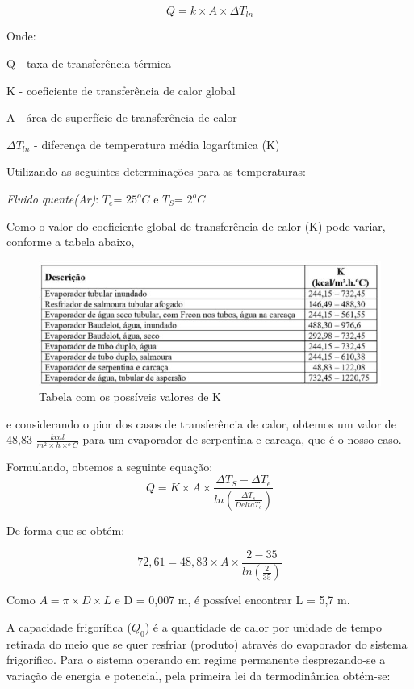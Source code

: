 	\begin{equation}
	Q = k \times A \times \Delta T_{ln}
	\end{equation}
	
	Onde:
	
	Q - taxa de transferência térmica 
	
	K - coeficiente de transferência de calor global
	
	A - área de superfície de transferência de calor
	
	$\Delta T_{ln}$ - diferença de temperatura média logarítmica (K)
	
	Utilizando as seguintes determinações para as temperaturas:
	
	\textit{Fluido quente(Ar)}: $T_e$= $25^oC$    e     $T_S$= $2^oC$
	
	
Como o valor do coeficiente global de transferência de calor (K) pode variar, conforme a tabela abaixo,
	\begin{figure}[H]
	\begin{center}
	\includegraphics[scale =1]{figuras/Tabela_K}
	\caption{Tabela com os possíveis valores de K}
	\end{center}
	\end{figure}
	
	e considerando o pior dos casos de transferência de calor, obtemos um valor de 48,83 $\frac{kcal}{m^2\times h \times ^oC}$ para um evaporador de serpentina e carcaça, que é o nosso caso.
	
	Formulando, obtemos a seguinte equação:
	$$
	Q = K \times A \times \frac{\Delta T_S - \Delta T_e}{ln\left(\frac{\Delta T_s}{Delta T_e}\right)}
	$$
	
	De forma que se obtém:
	
	$$
	72,61 = 48,83 \times A \times \frac{2 - 35}{ln\left(\frac{2}{35}\right)}
	$$
	
	Como $A = \pi \times D \times L$ e D = 0,007 m, é possível encontrar L = 5,7 m.
	 
	A capacidade frigorífica ($Q_0$) é a quantidade de calor por unidade de tempo retirada do meio que se quer resfriar (produto) através do evaporador do sistema frigorífico. Para o sistema operando em regime permanente desprezando-se a variação de energia e potencial, pela primeira lei da termodinâmica obtém-se: 
	

